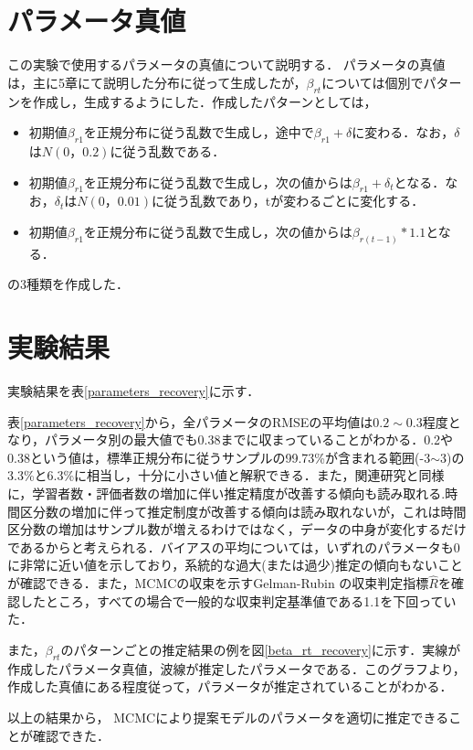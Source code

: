\documentclass[a4paper,11pt,oneside,openany]{jsbook}
\begin{document}
\section{パラメータ真値}
この実験で使用するパラメータの真値について説明する．
パラメータの真値は，主に5章にて説明した分布に従って生成したが，$\beta_{rt}$については個別でパターンを作成し，生成するようにした．作成したパターンとしては，
\begin{itemize}
\item 初期値$\beta_{r1}$を正規分布に従う乱数で生成し，途中で$\beta_{r1}+\delta$に変わる．なお，$\delta$は$N(0，0.2)$に従う乱数である．
\item 初期値$\beta_{r1}$を正規分布に従う乱数で生成し，次の値からは$\beta_{r1}+\delta_t$となる．なお，$\delta_t$は$N(0，0.01)$に従う乱数であり，tが変わるごとに変化する．
\item 初期値$\beta_{r1}$を正規分布に従う乱数で生成し，次の値からは$\beta_{r(t-1)}*1.1$となる．
\end{itemize}
の3種類を作成した．
\section{実験結果}
実験結果を表\ref{parameters_recovery}に示す．

表\ref{parameters_recovery}から，全パラメータのRMSEの平均値は$0.2\sim0.3$程度となり，パラメータ別の最大値でも0.38までに収まっていることがわかる．0.2や0.38という値は，標準正規分布に従うサンプルの99.73\%が含まれる範囲(-3$\sim$3)の3.3\%と6.3\%に相当し，十分に小さい値と解釈できる．また，関連研究と同様に，学習者数・評価者数の増加に伴い推定精度が改善する傾向も読み取れる.時間区分数の増加に伴って推定制度が改善する傾向は読み取れないが，これは時間区分数の増加はサンプル数が増えるわけではなく，データの中身が変化するだけであるからと考えられる．バイアスの平均については，いずれのパラメータも0に非常に近い値を示しており，系統的な過大(または過少)推定の傾向もないことが確認できる．また，MCMCの収束を示すGelman-Rubin の収束判定指標$ \hat{R} $\cite{RhatRubin,RhatCarlin}を確認したところ，すべての場合で一般的な収束判定基準値である1.1を下回っていた．

また，$\beta_{rt}$のパターンごとの推定結果の例を図\ref{beta_rt_recovery}に示す．実線が作成したパラメータ真値，波線が推定したパラメータである．このグラフより，作成した真値にある程度従って，パラメータが推定されていることがわかる．

以上の結果から， MCMCにより提案モデルのパラメータを適切に推定できることが確認できた．
\end{document}
